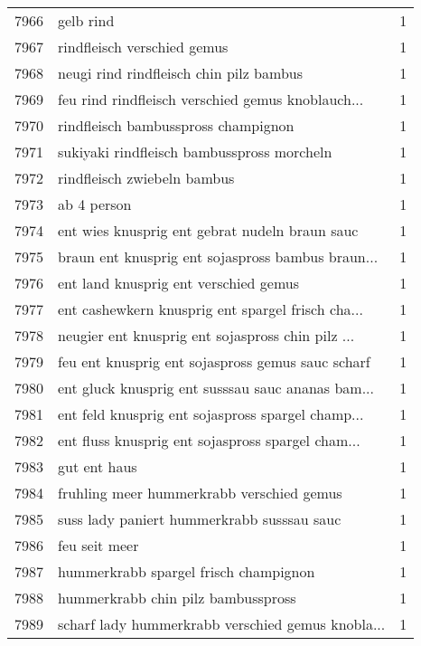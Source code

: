 \begin{tabular}{llr}
7966 &                                          gelb rind &      1 \\
7967 &                        rindfleisch verschied gemus &      1 \\
7968 &            neugi rind rindfleisch chin pilz bambus &      1 \\
7969 &  feu rind rindfleisch verschied gemus knoblauch... &      1 \\
7970 &                rindfleisch bambusspross champignon &      1 \\
7971 &         sukiyaki rindfleisch bambusspross morcheln &      1 \\
7972 &                        rindfleisch zwiebeln bambus &      1 \\
7973 &                                        ab 4 person &      1 \\
7974 &     ent wies knusprig ent gebrat nudeln braun sauc &      1 \\
7975 &  braun ent knusprig ent sojaspross bambus braun... &      1 \\
7976 &              ent land knusprig ent verschied gemus &      1 \\
7977 &  ent cashewkern knusprig ent spargel frisch cha... &      1 \\
7978 &  neugier ent knusprig ent sojaspross chin pilz ... &      1 \\
7979 &  feu ent knusprig ent sojaspross gemus sauc scharf &      1 \\
7980 &  ent gluck knusprig ent susssau sauc ananas bam... &      1 \\
7981 &  ent feld knusprig ent sojaspross spargel champ... &      1 \\
7982 &  ent fluss knusprig ent sojaspross spargel cham... &      1 \\
7983 &                                       gut ent haus &      1 \\
7984 &          fruhling meer hummerkrabb verschied gemus &      1 \\
7985 &         suss lady paniert hummerkrabb susssau sauc &      1 \\
7986 &                                      feu seit meer &      1 \\
7987 &              hummerkrabb spargel frisch champignon &      1 \\
7988 &                 hummerkrabb chin pilz bambusspross &      1 \\
7989 &  scharf lady hummerkrabb verschied gemus knobla... &      1 \\

\end{tabular}
